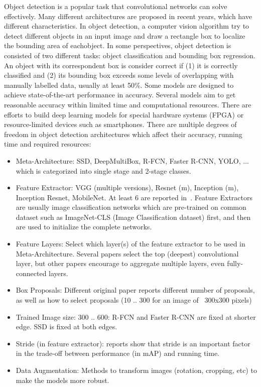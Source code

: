 \documentclass[conference]{IEEEtran}
\begin{document}
Object detection is a popular task that convolutional networks can solve effectively. Many different architectures are proposed in recent years, which have different characteristics. In object detection, a computer vision algorithm try to detect different objects in an input image and draw a rectangle box to localize the bounding area of eachobject. In some perspectives, object detection is consisted of two different tasks: object classification and bounding box regression. An object with its correspondent box is consider correct if (1) it is correctly classified and (2) its bounding box exceeds some levels of overlapping with manually labelled data, usually at least 50\%. Some models are designed to achieve state-of-the-art performance in accuracy. Several models aim to get reasonable accuracy within limited time and computational resources. There are efforts to build deep learning models for special hardware systems (FPGA) or resource-limited devices such as smartphones. There are multiple degrees of freedom in object detection architectures which affect their accuracy, running time and required resources:

\begin{itemize}
    \item Meta-Architecture: SSD, DeepMultiBox, R-FCN, Faster R-CNN, YOLO, ... which is categorized into single stage and 2-stage classes.
    \item Feature Extractor: VGG (multiple versions), Resnet (m), Inception (m), Inception Resnet, MobileNet. At least 6 are reported in~\cite{huang2017speed}. Feature Extractors are usually image classification networks which are pre-trained on common dataset such as ImageNet-CLS (Image Classification dataset) first, and then are used to initialize the complete networks. 
    \item Feature Layers: Select which layer(s) of the feature extractor to be used in Meta-Architecture. Several papers select the top (deepest) convolutional layer, but other papers encourage to aggregate multiple layers, even fully-connected layers.
    \item Box Proposals: Different original paper reports different number of proposals, as well as how to select proposals (10 .. 300 for an image of ~300x300 pixels)
    \item Trained Image size: 300 .. 600: R-FCN and Faster R-CNN are fixed at shorter edge. SSD is fixed at both edges.
    \item Stride (in feature extractor): reports show that stride is an important factor in the trade-off between performance (in mAP) and running time.
    \item Data Augmentation: Methods to transform images (rotation, cropping, etc) to make the models more robust.
\end{itemize}
\end{document}

